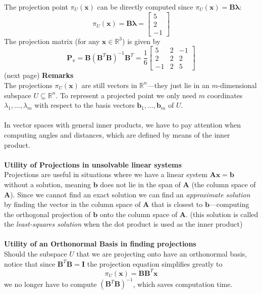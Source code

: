 \documentclass{report}
\begin{document}
The projection point $\pi_U(\bm{x})$ can be directly computed since $\pi_U(\bm{x})=\bm{B\lambda}$:
\begin{equation*}
\pi_U(\bm{x})=\bm{B\lambda}=\begin{bmatrix}
5\\2\\-1\end{bmatrix}
\end{equation*}
The projection matrix (for any $\bm{x}\in\mathbb{R}^3$) is given by
\begin{equation*}
\bm{P}_\pi=\bm{B}(\bm{B}^T\bm{B})^{-1}\bm{B}^T=\frac{1}{6}
\begin{bmatrix}
5&2&-1\\2&2&2\\-1&2&5
\end{bmatrix}
\end{equation*}
(next page)
\newpage
\noindent\textbf{Remarks}\\
The projections $\pi_U(\bm{x})$ are still vectors in $\mathbb{R}^n$---they just lie in an $m$-dimensional 
subspace $U\subseteq\mathbb{R}^n$. To represent
a projected point we only need $m$ coordinates $\lambda_1,\ldots,\lambda_m$ with 
respect to the basis vectors $\bm{b}_1,\ldots,\bm{b}_m$ of $U$.\\
\vspace{1mm}\\
In vector spaces with general inner products, we have to pay attention when computing angles
and distances, which are defined by means of the inner product.\\
\vspace{1mm}\\
\textbf{Utility of Projections in unsolvable linear systems}\\
Projections are useful in situations where we have a linear system $\bm{Ax}=\bm{b}$ without a solution, 
meaning $\bm{b}$ does not lie in the span of $\bm{A}$ (the column space of $\bm{A}$). 
Since we cannot find an exact solution we can find an \textit{approximate solution} by finding the vector in
the column space of $\bm{A}$ that is closest to $\bm{b}$---computing the orthogonal projection of 
$\bm{b}$ onto the column space of $\bm{A}$. (this solution is called the \textit{least-squares solution} 
when the dot product is used as the inner product)\\
\vspace{1mm}\\
\textbf{Utility of an Orthonormal Basis in finding projections}\\
Should the subspace $U$ that we are projecting onto have an orthonormal basis, notice that since 
$\bm{B}^T\bm{B}=\bm{I}$ the projection equation simplifies greatly to
\begin{equation*}
\pi_U(\bm{x})=\bm{BB}^T\bm{x}
\end{equation*}
we no longer have to compute $(\bm{B}^T\bm{B})^{-1}$, which saves computation time.
\newpage
\end{document}
